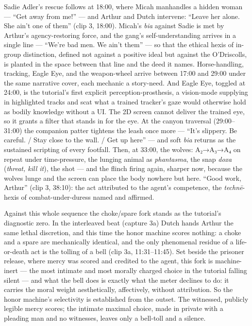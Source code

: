 Sadie Adler's rescue follows at 18:00, where Micah manhandles a hidden woman — ``Get away from me!'' — and Arthur and Dutch intervene: ``Leave her alone. She ain't one of them'' (clip 3, 18:00). Micah's \textit{bia} against Sadie is met by Arthur's agency-restoring force, and the gang's self-understanding arrives in a single line — ``We're bad men. We ain't them'' — so that the ethical hexis of in-group distinction, defined not against a positive ideal but against the O'Driscolls, is planted in the space between that line and the deed it names. Horse-handling, tracking, Eagle Eye, and the weapon-wheel arrive between 17:00 and 29:00 under the same narrative cover, each mechanic a story-need. And Eagle Eye, toggled at 24:00, is the tutorial's first explicit perception-prosthesis, a vision-mode supplying in highlighted tracks and scat what a trained tracker's gaze would otherwise hold as bodily knowledge without a UI. The 2D screen cannot deliver the trained eye, so it grants a filter that stands in for the eye. At the canyon traversal (29:00–31:00) the companion patter tightens the leash once more — ``It's slippery. Be careful. / Stay close to the wall. / Get up here'' — and soft \textit{bia} returns as the sustained scripting of every footfall. Then, at 33:00, the wolves: A₂→A₃→A₄ on repeat under time-pressure, the lunging animal as \textit{phantasma}, the snap \textit{doxa} (\textit{threat, kill it}), the shot — and the flinch firing again, sharper now, because the wolves lunge and the screen can place the body nowhere but here. ``Good work, Arthur'' (clip 3, 38:10): the act attributed to the agent's competence, the \textit{technē}-hexis of combat-under-duress named and affirmed.

Against this whole sequence the choke/spare fork stands as the tutorial's diagnostic zero. In the interleaved beat (capture 3a) Dutch hands Arthur the same lethal discretion, and this time the honor machine scores nothing: a choke and a spare are mechanically identical, and the only phenomenal residue of a life-or-death act is the tolling of a bell (clip 3a, 11:31–11:45). Set beside the prisoner release, where mercy was scored and credited to the agent, this fork is machine-inert — the most intimate and most morally charged choice in the tutorial falling silent — and what the bell does is exactly what the meter declines to do: it carries the moral weight aesthetically, affectively, without attribution. So the honor machine's selectivity is established from the outset. The witnessed, publicly legible mercy scores; the intimate maximal choice, made in private with a pleading man and no witnesses, leaves only a bell-toll and a silence.

